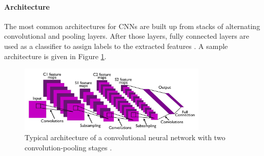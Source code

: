 

\paragraph{Architecture} \label{c:cnnarch}

The most common architectures for CNNs are built up from stacks of alternating convolutional and pooling layers. 
After those layers, fully connected layers are used as a classifier to assign labels to the extracted features \cite{NIPS2012_4824, simonyan2014very, szegedy2015going}.
A sample architecture is given in Figure \ref{fig:convarcitecuture}.

\begin{figure}[h!]
	\centering
    	\includegraphics[width=0.8\textwidth]{imgs/cnn_architecture.jpg} 
    \caption{Typical architecture of a convolutional neural network with two convolution-pooling stages \cite{cnnarchImg}.}
	\label{fig:convarcitecuture}
\end{figure}

